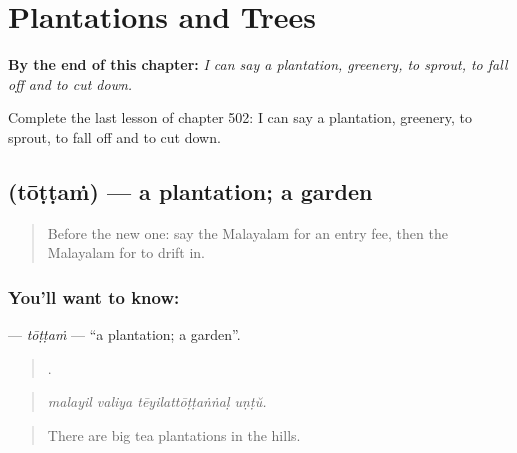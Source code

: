 
\chapter{Plantations and Trees}
\label{ch:ml-plantations-and-trees}

\begin{chapteropening}
\textbf{By the end of this chapter:} \emph{I can say a plantation, greenery, to sprout, to fall off and to cut down.}

Complete the last lesson of chapter 502: I can say a plantation, greenery, to sprout, to fall off and to cut down.
\end{chapteropening}

\section[\texorpdfstring{\ml{തോട്ടം} (tōṭṭaṁ)}{തോട്ടം (tōṭṭaṁ)}]{ (tōṭṭaṁ) — a plantation; a garden}

\label{lesson:ML-C502-tottam}



\begin{quote}
Before the new one: say the Malayalam for an entry fee, then the Malayalam for to drift in.
\end{quote}

\subsection*{You'll want to know: }
\textbf{} — \emph{tōṭṭaṁ} — \textquotedblleft{}a plantation; a garden\textquotedblright{}.

\begin{quote}
   .
\end{quote}

\begin{quote}
\emph{malayil valiya tēyilattōṭṭaṅṅaḷ uṇṭŭ.}
\end{quote}

\begin{quote}
There are big tea plantations in the hills.
\end{quote}

